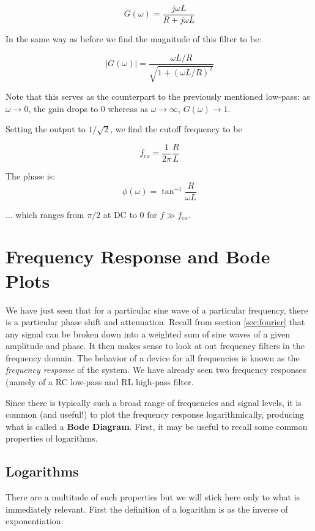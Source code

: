 \documentclass{tufte-book}
\begin{document}
$$
G(\omega) = \frac{j\omega L}{R+j\omega L}
$$

In the same way as before we find the magnitude of this filter to be:

\begin{equation}\label{eq:mag_RLHPfilt}
\vert G(\omega)\vert  = \frac{\omega L/R}{\sqrt{1 + \left(\omega L/R\right)^2}}
\end{equation}

\noindent Note that this serves as the counterpart to the previously mentioned low-pass: as $\omega \rightarrow 0$, the gain drops to 0 whereas as $\omega \rightarrow \infty$, $G(\omega) \rightarrow 1$.

\noindent Setting the output to $1/\sqrt{2}$, we find the cutoff frequency to be

\begin{equation}\label{eq:f_cutoff_RL}
f_\text{co} = \frac{1}{2\pi}\frac{R}{L}
\end{equation}

\noindent The phase is:
\begin{equation}\label{eq:phs_RLHPfilt}
\phi(\omega) = \tan^{-1}\frac{R}{\omega L}
\end{equation}

\noindent... which ranges from $\pi/2$ at DC to $0$ for $f\gg f_\text{co}$.

\section{Frequency Response and Bode Plots}
We have just seen that for a particular sine wave of a particular frequency, there is a particular phase shift and attenuation. Recall from section \ref{sec:fourier} that any signal can be broken down into a weighted sum of sine waves of a given amplitude and phase. It then makes sense to look at out frequency filters in the frequency domain. The behavior of a device for all frequencies is known as the \textit{frequency response} of the system. We have already seen two frequency responses (namely of a RC low-pass and RL high-pass filter.

Since there is typically such a broad range of frequencies and signal levels, it is common (and useful!) to plot the frequency response logarithmically, producing what is called a \textbf{Bode Diagram}. First, it may be useful to recall some common properties of logarithms. 

\subsection{Logarithms}
There are a multitude of such properties  but we will stick here only to what is immediately relevant. First the definition of a logarithm is as the inverse of exponentiation:
\end{document}
